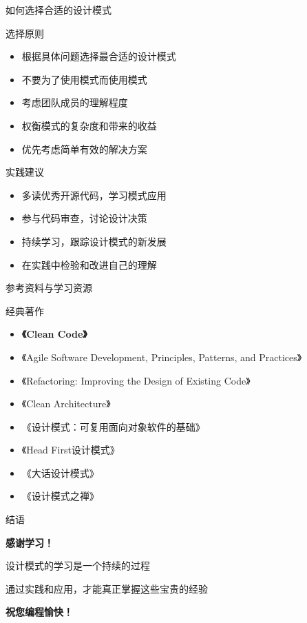 \documentclass[UTF8,aspectratio=169]{beamer}
\begin{document}
\begin{frame}{如何选择合适的设计模式}
    \begin{ytublock}{选择原则}
        \begin{itemize}
            \item 根据具体问题选择最合适的设计模式
            \item 不要为了使用模式而使用模式
            \item 考虑团队成员的理解程度
            \item 权衡模式的复杂度和带来的收益
            \item 优先考虑简单有效的解决方案
        \end{itemize}
    \end{ytublock}

    \begin{ytublock}{实践建议}
        \begin{itemize}
            \item 多读优秀开源代码，学习模式应用
            \item 参与代码审查，讨论设计决策
            \item 持续学习，跟踪设计模式的新发展
            \item 在实践中检验和改进自己的理解
        \end{itemize}
    \end{ytublock}
\end{frame}

\begin{frame}{参考资料与学习资源}
    \begin{ytublock}{经典著作}
        \begin{itemize}
            \item  \textbf{《Clean Code》}
            \item 《Agile Software Development, Principles, Patterns, and Practices》
            \item 《Refactoring: Improving the Design of Existing Code》
            \item 《Clean Architecture》

            \item 《设计模式：可复用面向对象软件的基础》
            \item 《Head First设计模式》
            \item 《大话设计模式》
            \item 《设计模式之禅》
        \end{itemize}
    \end{ytublock}
\end{frame}

\begin{frame}{结语}
    \begin{center}
        \Huge{\textbf{感谢学习！}}

        \vspace{1cm}

        \Large{设计模式的学习是一个持续的过程}

        \vspace{0.5cm}

        \large{通过实践和应用，才能真正掌握这些宝贵的经验}

        \vspace{1cm}

        \textbf{祝您编程愉快！}
    \end{center}
\end{frame}
\end{document}
